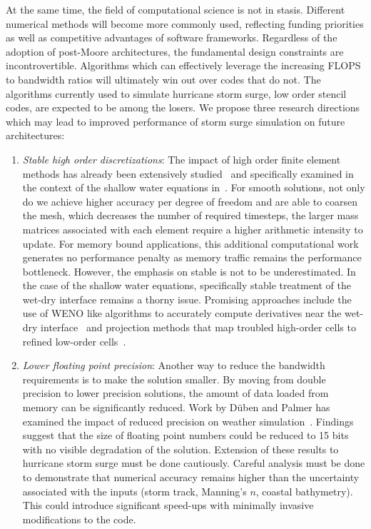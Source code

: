At the same time, the field of computational science is not in stasis. Different numerical methods will become more commonly used, reflecting funding priorities as well as competitive advantages of software frameworks. Regardless of the adoption of post-Moore architectures, the fundamental design constraints are incontrovertible. Algorithms which can effectively leverage the increasing FLOPS to bandwidth ratios will ultimately win out over codes that do not. The algorithms currently used to simulate hurricane storm surge, low order stencil codes, are expected to be among the losers. We propose three research directions which may lead to improved performance of storm surge simulation on future architectures:
\begin{enumerate}
\item {\em Stable high order discretizations}:
  The impact of high order finite element methods has already been extensively studied~\cite{Swirydowicz2019, Fischer2020, Friedrich2019, Breuer2016, Uphoff2017, Pazner2018} and specifically examined in the context of the shallow water equations in~\cite{Gandham2015, Wintermeyer2018, Brus2017, Brus2019, Marras2018, Bonev2018}. For smooth solutions, not only do we achieve higher accuracy per degree of freedom and are able to coarsen the mesh, which decreases the number of required timesteps, the larger mass matrices associated with each element require a higher arithmetic intensity to update. For memory bound applications, this additional computational work generates no performance penalty as memory traffic remains the performance bottleneck.
  However, the emphasis on stable is not to be underestimated. In the case of the shallow water equations, specifically stable treatment of the wet-dry interface remains a thorny issue. Promising approaches include the use of WENO like algorithms to accurately compute derivatives near the wet-dry interface~\cite{Bonev2018} and projection methods that map troubled high-order cells to refined low-order cells~\cite{Rannabauer2018}.
\item {\em Lower floating point precision}: Another way to reduce the bandwidth requirements is to make the solution smaller. By moving from double precision to lower precision solutions, the amount of data loaded from memory can be significantly reduced. Work by D\"{u}ben and Palmer has examined the impact of reduced precision on weather simulation~\cite{Dueben2014}. Findings suggest that the size of floating point numbers could be reduced to 15 bits with no visible degradation of the solution. Extension of these results to hurricane storm surge must be done cautiously. Careful analysis must be done to demonstrate that numerical accuracy remains higher than the uncertainty associated with the inputs (storm track, Manning's $n$, coastal bathymetry). This could introduce significant speed-ups with minimally invasive modifications to the code.

\end{enumerate}
